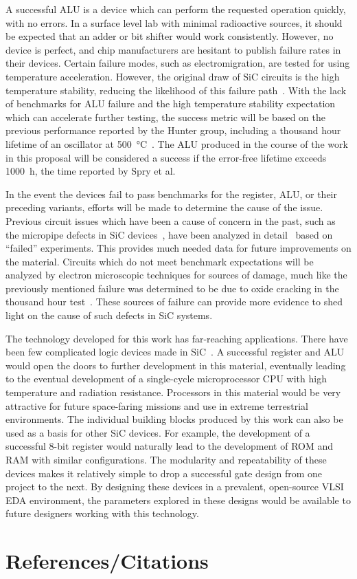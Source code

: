 \documentclass[12pt]{amsart}
\begin{document}
	A successful ALU is a device which can perform the requested operation quickly, with no errors.  In a surface level lab with minimal radioactive sources, it should be expected that an adder or bit shifter would work consistently.  However, no device is perfect, and chip manufacturers are hesitant to publish failure rates in their devices.  Certain failure modes, such as electromigration, are tested for using temperature acceleration.  However, the original draw of SiC circuits is the high temperature stability, reducing the likelihood of this failure path~\cite{casady_status_1996}.  With the lack of benchmarks for ALU failure and the high temperature stability expectation which can accelerate further testing, the success metric will be based on the previous performance reported by the Hunter group, including a thousand hour lifetime of an oscillator at \SI{500}{\degreeCelsius}~\cite{spry2016processing}.  The ALU produced in the course of the work in this proposal will be considered a success if the error-free lifetime exceeds \SI{1000}{\hour}, the time reported by Spry et al.  
	
	In the event the devices fail to pass benchmarks for the register, ALU, or their preceding variants, efforts will be made to determine the cause of the issue.  Previous circuit issues which have been a cause of concern in the past, such as the micropipe defects in SiC devices~\cite{casady_status_1996}, have been analyzed in detail~\cite{neudeck_performance_1994-1} based on ``failed'' experiments.  This provides much needed data for future improvements on the material.  Circuits which do not meet benchmark expectations will be analyzed by electron microscopic techniques for sources of damage, much like the previously mentioned failure was determined to be due to oxide cracking in the thousand hour test~\cite{spry2016processing}.  These sources of failure can provide more evidence to shed light on the cause of such defects in SiC systems.  
	
	The technology developed for this work has far-reaching applications.  There have been few complicated logic devices made in SiC~\cite{spry2016processing}.  A successful register and ALU would open the doors to further development in this material, eventually leading to the eventual development of a single-cycle microprocessor CPU with high temperature and radiation resistance.  Processors in this material would be very attractive for future space-faring missions and use in extreme terrestrial environments.  The individual building blocks produced by this work can also be used as a basis for other SiC devices.  For example, the development of a successful 8-bit register would naturally lead to the development of ROM and RAM with similar configurations.  The modularity and repeatability of these devices makes it relatively simple to drop a successful gate design from one project to the next.  By designing these devices in a prevalent, open-source VLSI EDA environment, the parameters explored in these designs would be available to future designers working with this technology.  

 	\section{References/Citations}
 	\begin{spacing}{2}
 	
 	
	\end{spacing}
 	
 
\end{document}
